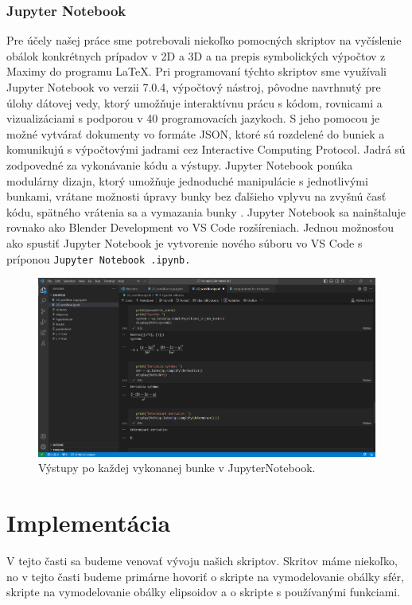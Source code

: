 \subsubsection{Jupyter Notebook}
Pre účely našej práce sme potrebovali niekoľko pomocných skriptov na vyčíslenie obálok konkrétnych prípadov v 2D a 3D a na prepis symbolických výpočtov z Maximy do programu \LaTeX. Pri programovaní týchto skriptov sme využívali Jupyter Notebook vo verzii 7.0.4, výpočtový nástroj, pôvodne navrhnutý pre úlohy dátovej vedy, ktorý umožňuje interaktívnu prácu s kódom, rovnicami a vizualizáciami s podporou v 40 programovacích jazykoch. S jeho pomocou je možné vytvárať dokumenty vo formáte JSON, ktoré sú rozdelené do buniek a komunikujú s výpočtovými jadrami cez Interactive Computing Protocol. Jadrá sú zodpovedné za vykonávanie kódu a výstupy. Jupyter Notebook ponúka modulárny dizajn, ktorý umožňuje jednoduché manipulácie s jednotlivými bunkami, vrátane možnosti úpravy bunky bez ďalšieho vplyvu na zvyšnú časť kódu, spätného vrátenia sa a vymazania bunky \cite{Jupyter}. Jupyter Notebook sa nainštaluje rovnako ako Blender Development vo VS Code rozšíreniach. 
Jednou možnosťou ako spustiť Jupyter Notebook je vytvorenie nového súboru vo VS Code s príponou \verb|Jupyter Notebook .ipynb.| 
\begin{figure}[h]
	\centering
	\includegraphics[width=\textwidth]{images/jupyter.png}
	\caption[Jupyter Notebook.]{Výstupy po každej vykonanej bunke v JupyterNotebook.}
	\label{fig:jupyter}
\end{figure}

\section{Implementácia}
V tejto časti sa budeme venovať vývoju našich skriptov. Skritov máme niekoľko, no v tejto časti budeme primárne hovoriť o skripte na vymodelovanie obálky sfér, skripte na vymodelovanie obálky elipsoidov a o skripte s používanými funkciami.



